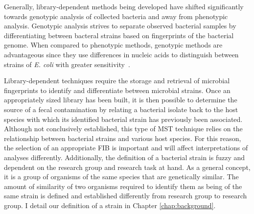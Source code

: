 \documentclass[12pt]{ucthesis}
\begin{document}
   Generally, library-dependent methods being developed have shifted
   significantly towards genotypic analysis of collected bacteria and away from
   phenotypic analysis. Genotypic analysis strives to separate observed
   bacterial samples by differentiating between bacteral strains based on
   fingerprints of the bacterial genome. When compared to phenotypic methods, genotypic
   methods are advantageous since they use differences in nucleic acids to
   distinguish between strains of \textit{E. coli} with greater
   sensitivity~\cite{Anderson:Diversity, Gordon:StrainTyping, Ochman:Enzyme,
   Scott:CurrentMST, Simpson:StateOf}.

   Library-dependent techniques require the storage and retrieval of microbial fingerprints to
   identify and differentiate between microbial strains. Once an appropriately
   sized library has been built, it is then possible to determine the source of
   a fecal contamination by relating a bacterial isolate back to the host
   species with which its identified bacterial strain has previously been
   associated. Although not conclusively established, this type of MST
   technique relies on the relationship between bacterial strains and various
   host species. For this reason, the selection of an appropriate FIB is
   important and will affect interpretations of analyses differently.
   Additionally, the definition of a bacterial strain is fuzzy and dependent on
   the research group and research task at hand. As a general concept, it is
   a group of organisms of the same species that are genetically similar. The
   amount of similarity of two organisms required to identify them as being of
   the same strain is defined and established differently from research group
   to research group. I detail our definition of a strain in Chapter
   \ref{chap:background}.
   
\end{document}
